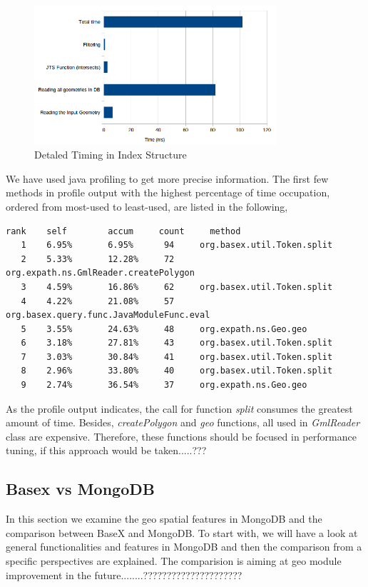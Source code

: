 \documentclass[a4paper,12pt]{article}
\begin{document}
\begin{figure}
\centering
\includegraphics[width=0.8\textwidth,height=0.25\textheight]{detailedTiming}
\caption{Detaled Timing in Index Structure}
\label{figDetailedTiming}
\end{figure}


We have used java profiling to get more precise information. The first few methods in profile output with the highest percentage of time occupation, ordered from most-used to least-used, are listed in the following,

\begin{verbatim}
rank   	self  		accum     count   	method
   1 	6.95%  		6.95%      94  	  org.basex.util.Token.split
   2  	5.33% 		12.28%     72 	  org.expath.ns.GmlReader.createPolygon
   3  	4.59% 		16.86%     62  	  org.basex.util.Token.split
   4  	4.22% 		21.08%     57  	  org.basex.query.func.JavaModuleFunc.eval
   5  	3.55% 		24.63%     48  	  org.expath.ns.Geo.geo
   6  	3.18% 		27.81%     43 	  org.basex.util.Token.split
   7 	3.03% 		30.84%     41  	  org.basex.util.Token.split
   8  	2.96% 		33.80%     40  	  org.basex.util.Token.split
   9  	2.74% 		36.54%     37  	  org.expath.ns.Geo.geo
\end{verbatim} 

As the profile output indicates, the call for function \textit{split} consumes the greatest amount of time. Besides, \textit{createPolygon} and \textit{geo} functions, all used in \textit{GmlReader} class are expensive. Therefore, these functions should be focused in performance tuning, if this approach would be taken.....???











\subsection{Basex vs MongoDB}
In this section we examine the geo spatial features in MongoDB and the comparison between BaseX and MongoDB.
To start with, we will have a look at general functionalities and features in MongoDB and then the comparison from a specific perspectives are explained. The comparision is aiming at geo module improvement in the future........?????????????????????
\end{document}
